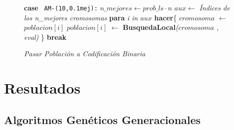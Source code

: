 \begin{figure}[H]
\begin{minipage}{.9\linewidth}
\begin{algorithm}[H]
{				
				
				\hfill \break 
				\text{ } \textbf{case} \texttt{ AM-(10,0.1mej):} \break 
				\text{  } \hspace{0.3cm} $n\_mejores \leftarrow prob\_ls \cdot n$ \;
				\text{  } \hspace{0.5cm} $aux \leftarrow$ \textit{Índices de los n\_mejores cromosomas}\; \break
				\text{  } \hspace{0.5cm} \textbf{para} \textit{i in $aux$} \textbf{hacer}\{ \break
				\text{  } \hspace{0.8cm} $cromosoma$ $\leftarrow$ $poblacion[i]$ \;
				\text{  } \hspace{1cm} $poblacion[i]$ $\leftarrow$ \textbf{BusquedaLocal}\textit{($cromosoma$ , eval)}\;
				\text{  } \hspace{0.5cm} \} \break
				\text{} \hspace{0.4cm} \textbf{break} \;
				
				
				
				
				
								
				

				\textit{Pasar Población a Codificación Binaria} \;
				
				
			}
			
		\end{algorithm} 
		
	\end{minipage}
\end{figure}







\newpage
\section{Resultados}

\subsection{Algoritmos Genéticos Generacionales}




